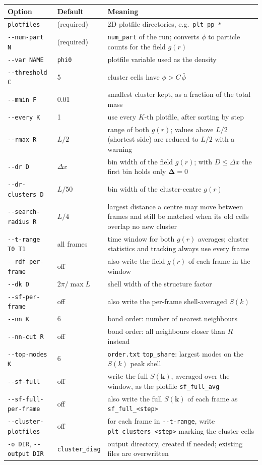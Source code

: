 \documentclass[11pt]{article}
\newcommand{\code}[1]{\texttt{#1}}
\begin{document}
\begin{center}
\begin{tabularx}{\textwidth}{@{}l l L@{}}
\toprule
Option & Default & Meaning \\
\midrule
\code{plotfiles} & (required) & 2D plotfile directories, e.g.\ \code{plt\_pp\_*} \\
\code{-{}-num-part N} & (required) & \code{num\_part} of the run; converts $\phi$ to particle counts for the field $g(r)$ \\
\code{-{}-var NAME} & \code{phi0} & plotfile variable used as the density \\
\code{-{}-threshold C} & 5 & cluster cells have $\phi > C\,\bar\phi$ \\
\code{-{}-mmin F} & 0.01 & smallest cluster kept, as a fraction of the total mass \\
\code{-{}-every K} & 1 & use every $K$-th plotfile, after sorting by step \\
\code{-{}-rmax R} & $L/2$ & range of both $g(r)$; values above $L/2$ (shortest side) are reduced to $L/2$ with a warning \\
\code{-{}-dr D} & $\Delta x$ & bin width of the field $g(r)$; with $D\le\Delta x$ the first bin holds only $\boldsymbol{\Delta}=0$ \\
\code{-{}-dr-clusters D} & $L/50$ & bin width of the cluster-centre $g(r)$ \\
\code{-{}-search-radius R} & $L/4$ & largest distance a centre may move between frames and still be matched when its old cells overlap no new cluster \\
\code{-{}-t-range T0 T1} & all frames & time window for both $g(r)$ averages; cluster statistics and tracking always use every frame \\
\code{-{}-rdf-per-frame} & off & also write the field $g(r)$ of each frame in the window \\
\code{-{}-dk D} & $2\pi/\max L$ & shell width of the structure factor \\
\code{-{}-sf-per-frame} & off & also write the per-frame shell-averaged $S(k)$ \\
\code{-{}-nn K} & 6 & bond order: number of nearest neighbours \\
\code{-{}-nn-cut R} & off & bond order: all neighbours closer than $R$ instead \\
\code{-{}-top-modes K} & 6 & \code{order.txt} \code{top\_share}: largest modes on the $S(k)$ peak shell \\
\code{-{}-sf-full} & off & write the full $S(\mathbf k)$, averaged over the window, as the plotfile \code{sf\_full\_avg} \\
\code{-{}-sf-full-per-frame} & off & also write the full $S(\mathbf k)$ of each frame as \code{sf\_full\_<step>} \\
\code{-{}-cluster-plotfiles} & off & for each frame in \code{-{}-t-range}, write \code{plt\_clusters\_<step>} marking the cluster cells \\
\code{-o DIR}, \code{-{}-output DIR} & \code{cluster\_diag} & output directory, created if needed; existing files are overwritten \\
\bottomrule
\end{tabularx}
\end{center}
\end{document}
